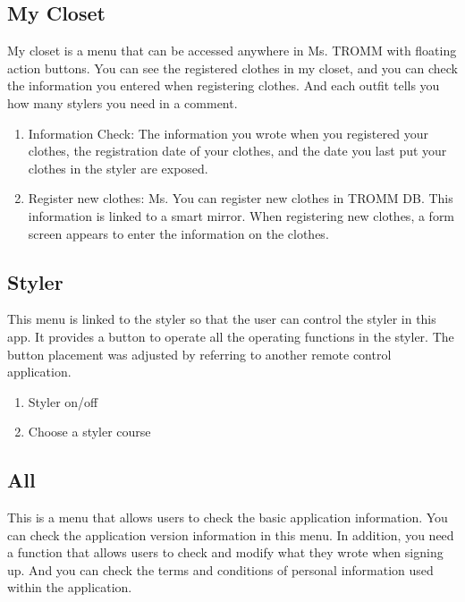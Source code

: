 \documentclass[conference]{IEEEtran}
\begin{document}
\subsection{My Closet}
My closet is a menu that can be accessed anywhere in Ms. TROMM with floating action buttons. You can see the registered clothes in my closet, and you can check the information you entered when registering clothes. And each outfit tells you how many stylers you need in a comment.\\
\begin{enumerate}
    \item Information Check: The information you wrote when you registered your clothes, the registration date of your clothes, and the date you last put your clothes in the styler are exposed.\\
    \item Register new clothes: Ms. You can register new clothes in TROMM DB. This information is linked to a smart mirror. When registering new clothes, a form screen appears to enter the information on the clothes.\\
\end{enumerate}

\subsection{Styler}
This menu is linked to the styler so that the user can control the styler in this app. It provides a button to operate all the operating functions in the styler. The button placement was adjusted by referring to another remote control application.\\
\begin{enumerate}
    \item Styler on/off\\
    \item Choose a styler course\\
\end{enumerate}

\subsection{All}
This is a menu that allows users to check the basic application information. You can check the application version information in this menu. In addition, you need a function that allows users to check and modify what they wrote when signing up. And you can check the terms and conditions of personal information used within the application.\\
\end{document}
